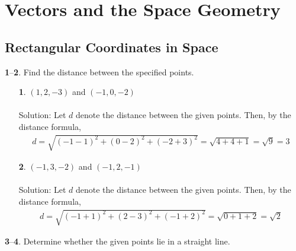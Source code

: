 \documentclass[12pt]{amsbook}
\begin{document}

\chapter{Vectors and the Space Geometry}
\section{Rectangular Coordinates in Space}
\noindent
{\small {\bf 1}--{\bf 2}}. Find the distance between the specified
points.
\begin{enumerate}
  \item[{\small\bf 1}.] $(1,2,-3)$ and $(-1,0,-2)$\\
  \\
  {\sc Solution}: Let $d$ denote the distance between the given points. Then, by the distance formula, \begin{align*}
d=\sqrt{(-1-1)^2+(0-2)^2+(-2+3)^2}=\sqrt{4+4+1}=\sqrt{9}=3
\end{align*}
  \item[{\small\bf 2}.] $(-1,3,-2)$ and $(-1,2,-1)$\\
  \\
  {\sc Solution}: Let $d$ denote the distance between the given points. Then, by the distance formula, \begin{align*}
d=\sqrt{(-1+1)^2+(2-3)^2+(-1+2)^2}=\sqrt{0+1+2}=\sqrt{2}
\end{align*}
\end{enumerate}
\noindent
{\small {\bf 3}--{\bf 4}}. Determine whether the given points lie in 
a straight line. 
\end{document}
